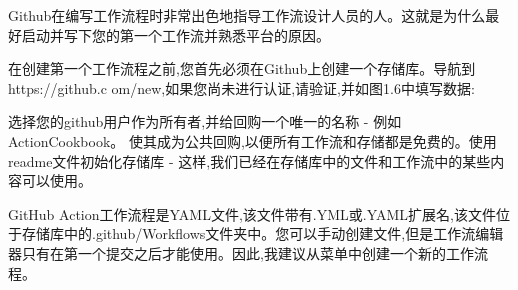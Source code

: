 
Github在编写工作流程时非常出色地指导工作流设计人员的人。这就是为什么最好启动并写下您的第一个工作流并熟悉平台的原因。


在创建第一个工作流程之前,您首先必须在Github上创建一个存储库。导航到https://github.c om/new,如果您尚未进行认证,请验证,并如图1.6中填写数据:


选择您的github用户作为所有者,并给回购一个唯一的名称 - 例如ActionCookbook。 使其成为公共回购,以便所有工作流和存储都是免费的。使用readme文件初始化存储库 - 这样,我们已经在存储库中的文件和工作流中的某些内容可以使用。


GitHub Action工作流程是YAML文件,该文件带有.YML或.YAML扩展名,该文件位于存储库中的.github/Workflows文件夹中。您可以手动创建文件,但是工作流编辑器只有在第一个提交之后才能使用。因此,我建议从菜单中创建一个新的工作流程。

